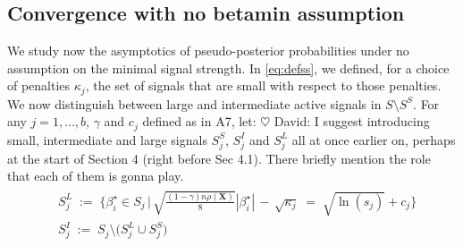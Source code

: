 \documentclass[aos]{imsart}
\theoremstyle{plain}
\newcommand{\david}[1]{{\small{\color{blue} \sf $\heartsuit$ David: #1}}}
\newcommand{\bs}{\boldsymbol}
\begin{document}
\subsection{Convergence with no betamin assumption}\label{ssec:nobetaminhyp}

We study now the asymptotics of pseudo-posterior probabilities under no assumption on the minimal signal strength. In \eqref{eq:defss}, we defined, for a choice of penalties $\kappa_j$, the set of signals that are small with respect to those penalties. We now distinguish between large and intermediate active signals in $S \setminus S^S$. For any $j=1,\ldots,b$, $\gamma$ and $c_j$ defined as in A7, let: 
\david{I suggest introducing small, intermediate and large signals $S_j^S$, $S_j^I$ and $S_j^L$ all at once earlier on, perhaps at the start of Section 4 (right before Sec 4.1). There briefly mention the role that each of them is gonna play.}
\begin{align}\label{eq:defslsi}
 \begin{split}
    &S_j^{L}\;:=\;\Bigg\{\beta_i^{\star} \in S_j \,\Big|\,\sqrt{\frac{(1-\gamma) n\rho(\bs X)}{8}}|\beta_{i}^{\star}| \,- \,\sqrt{\kappa_j} \;=\; \sqrt{\ln(s_j)} + c_{j}\Bigg\}\\
    &S_j^{I}\;:=\;S_j \setminus \big(S_j^L \cup S_j^S\big)
 \end{split}
\end{align}
\end{document}
